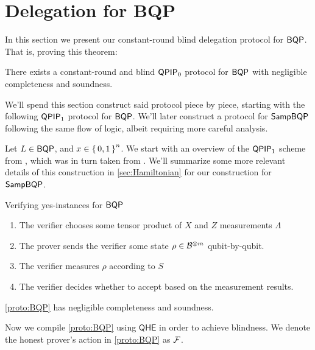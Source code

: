 \section{Delegation for BQP}
\label{sec:BlindBQP}

In this section we present our constant-round blind delegation protocol for $\operatorname{\mathsf{BQP}}$. That is, proving this theorem:
\begin{thm}
	There exists a constant-round and blind $\operatorname{\mathsf{QPIP}}_0$ protocol for $\operatorname{\mathsf{BQP}}$ with negligible completeness and soundness.
\end{thm}
We'll spend this section construct said protocol piece by piece, starting with the following $\operatorname{\mathsf{QPIP}}_1$ protocol for $\operatorname{\mathsf{BQP}}$.
We'll later construct a protocol for $\operatorname{\mathsf{SampBQP}}$ following the same flow of logic, albeit requiring more careful analysis.

Let $L\in\operatorname{\mathsf{BQP}}$, and $x\in\set{0,1}^n$.
We start with an overview of the $\operatorname{\mathsf{QPIP}}_1$ scheme from \cite{mahadev_delegation}, which was in turn taken from \cite{mf16}.
We'll summarize some more relevant details of this construction in \cref{sec:Hamiltonian} for our construction for $\operatorname{\mathsf{SampBQP}}$.

\begin{protocol}{Verifying yes-instances for $\operatorname{\mathsf{BQP}}$}
	\label{proto:BQP}
	\begin{enumerate}
		\item The verifier chooses some tensor product of $X$ and $Z$ measurements $\Lambda$
		\item The prover sends the verifier some state $\rho\in\mathcal{B}^{\otimes m}$ qubit-by-qubit.
		\item The verifier measures $\rho$ according to $S$
		\item The verifier decides whether to accept based on the measurement results.
	\end{enumerate}
\end{protocol}

\cref{proto:BQP} has negligible completeness and soundness. 

Now we compile \cref{proto:BQP} using $\mathsf{QHE}$ in order to achieve blindness.
We denote the honest prover's action in \cref{proto:BQP} as $\mathcal{F}$.

